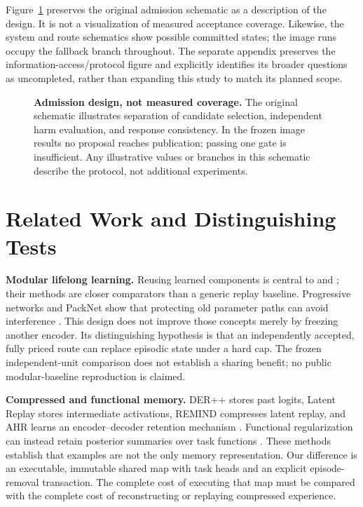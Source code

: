 \documentclass{article}
\begin{document}
Figure~\ref{fig:admission} preserves the original admission schematic as a description of the design. It is not a visualization of measured acceptance coverage. Likewise, the system and route schematics show possible committed states; the image runs occupy the fallback branch throughout. The separate appendix preserves the information-access/protocol figure and explicitly identifies its broader questions as uncompleted, rather than expanding this study to match its planned scope.

\begin{figure}[t]
\centering{}
\caption{\textbf{Admission design, not measured coverage.} The original schematic illustrates separation of candidate selection, independent harm evaluation, and response consistency. In the frozen image results no proposal reaches publication; passing one gate is insufficient. Any illustrative values or branches in this schematic describe the protocol, not additional experiments.}
\label{fig:admission}
\end{figure}

\section{Related Work and Distinguishing Tests}
\label{sec:related}
\textbf{Modular lifelong learning.} Reusing learned components is central to \citet{mendez2021} and \citet{veniat2021}; their methods are closer comparators than a generic replay baseline. Progressive networks and PackNet show that protecting old parameter paths can avoid interference \cite{rusu2016,mallya2018}. This design does not improve those concepts merely by freezing another encoder. Its distinguishing hypothesis is that an independently accepted, fully priced route can replace episodic state under a hard cap. The frozen independent-unit comparison does not establish a sharing benefit; no public modular-baseline reproduction is claimed.

\textbf{Compressed and functional memory.} DER++ stores past logits, Latent Replay stores intermediate activations, REMIND compresses latent replay, and AHR learns an encoder--decoder retention mechanism \cite{buzzega2020,pellegrini2019,hayes2020,nori2025}. Functional regularization can instead retain posterior summaries over task functions \cite{titsias2020}. These methods establish that examples are not the only memory representation. Our difference is an executable, immutable shared map with task heads and an explicit episode-removal transaction. The complete cost of executing that map must be compared with the complete cost of reconstructing or replaying compressed experience.
\end{document}
